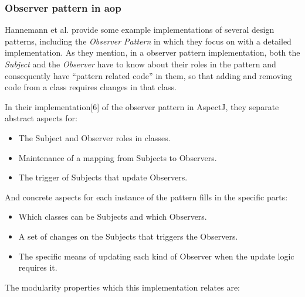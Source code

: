 \subsubsection{Observer pattern in \acrlong{aop}}\label{Observer pattern in Aspect Oriented Programming}
Hannemann et al. \cite{hannemann2002design} provide some example implementations of several design patterns, including the \textit{Observer Pattern} in which they focus on with a detailed implementation. As they mention, in a observer pattern implementation, both the \textit{Subject} and the \textit{Observer} have to know about their roles in the pattern and consequently have ``pattern related code'' in them, so that adding and removing code from a class requires changes in that class. 

In their implementation[6] of the observer pattern in AspectJ, they separate abstract aspects for: 
\begin{itemize}
	\item The Subject and Observer roles in classes.

	\item Maintenance of a mapping from Subjects to Observers.

	\item The trigger of Subjects that update Observers.
\end{itemize}

And concrete aspects for each instance of the pattern fills in the specific parts:
\begin{itemize}
	\item Which classes can be Subjects and which Observers.

	\item A set of changes on the Subjects that triggers the Observers.

	\item The specific means of updating each kind of Observer when the update logic requires it.
\end{itemize}


The modularity properties which this implementation relates are:

